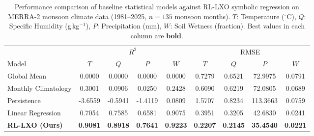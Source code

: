 \begin{table}[H]
\centering
\caption{Performance comparison of baseline statistical models against RL-LXO symbolic regression on MERRA-2 monsoon climate data (1981--2025, $n=135$ monsoon months). $T$: Temperature ($^\circ$C), $Q$: Specific Humidity (g\,kg$^{-1}$), $P$: Precipitation (mm), $W$: Soil Wetness (fraction). Best values in each column are \textbf{bold}.}
\label{tab:baselines}
\begin{tabular}{l cccc cccc}
\toprule
 & \multicolumn{4}{c}{$R^{2}$} & \multicolumn{4}{c}{RMSE} \\
\cmidrule(lr){2-5} \cmidrule(lr){6-9}
Model & $T$ & $Q$ & $P$ & $W$ & $T$ & $Q$ & $P$ & $W$ \\
\midrule
Global Mean & 0.0000 & 0.0000 & 0.0000 & 0.0000 & 0.7279 & 0.6521 & 72.9975 & 0.0791 \\
Monthly Climatology & 0.3001 & 0.0906 & 0.0250 & 0.2428 & 0.6090 & 0.6219 & 72.0805 & 0.0689 \\
Persistence & -3.6559 & -0.5941 & -1.4119 & 0.0809 & 1.5707 & 0.8234 & 113.3663 & 0.0759 \\
Linear Regression & 0.7054 & 0.7585 & 0.6581 & 0.9075 & 0.3951 & 0.3205 & 42.6830 & 0.0241 \\
\textbf{RL-LXO (Ours)} & \textbf{0.9081} & \textbf{0.8918} & \textbf{0.7641} & \textbf{0.9223} & \textbf{0.2207} & \textbf{0.2145} & \textbf{35.4540} & \textbf{0.0221} \\
\bottomrule
\end{tabular}
\end{table}